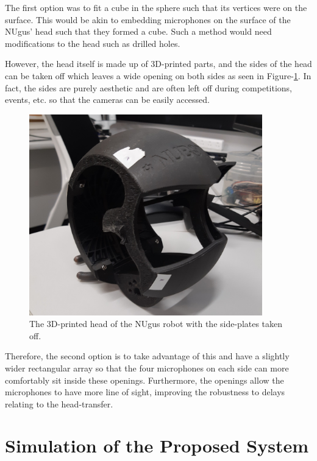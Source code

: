 \documentclass[notitlepage]{report}
\begin{document}
The first option was to fit a cube in the sphere such that its vertices were on the surface. This would be akin to embedding microphones on the surface of the NUgus' head such that they formed a cube. Such a method would need modifications to the head such as drilled holes.

However, the head itself is made up of 3D-printed parts, and the sides of the head can be taken off which leaves a wide opening on both sides as seen in Figure-\ref{fig:geometry_head}. In fact, the sides are purely aesthetic and are often left off during competitions, events, etc. so that the cameras can be easily accessed.

\begin{figure}[H]
\includegraphics[width=0.9\textwidth]{./photo_head.jpg}
\centering
\caption{The 3D-printed head of the NUgus robot with the side-plates taken off.}
\label{fig:geometry_head}
\centering
\end{figure}

Therefore, the second option is to take advantage of this and have a slightly wider rectangular array so that the four microphones on each side can more comfortably sit inside these openings. Furthermore, the openings allow the microphones to have more line of sight, improving the robustness to delays relating to the head-transfer.

\chapter{Simulation of the Proposed System} \label{Simulation_of_the_Proposed_System}
\end{document}
